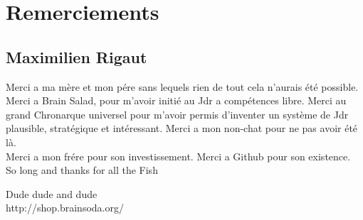 \backmatter

\chapter*{\center \huge Remerciements}
\section*{Maximilien Rigaut}
Merci a ma mère et mon pére sans lequels rien de tout cela n'aurais été possible.
Merci a Brain Salad, pour m'avoir initié au Jdr a compétences libre. 
Merci au grand Chronarque universel pour m'avoir permis d'inventer un système de Jdr plausible, stratégique et intéressant. 
Merci a mon non-chat pour ne pas avoir été là.\\
Merci a mon frére pour son investissement. Merci a Github pour son existence. \\

So long and thanks for all the Fish


\begin{thebibliography}{99}
  
Dude dude and dude \\
http://shop.brainsoda.org/
 
\end{thebibliography}
